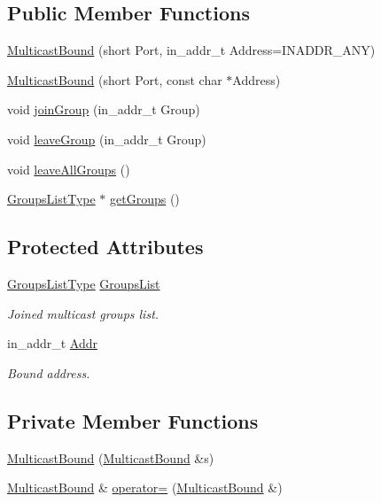 \subsection*{Public Member Functions}
\begin{DoxyCompactItemize}
\item 
\hyperlink{classMulticastBound_aed105f983bf0ec03ddea66770e2622e7}{Multicast\+Bound} (short Port, in\+\_\+addr\+\_\+t Address=I\+N\+A\+D\+D\+R\+\_\+\+A\+NY)
\item 
\hyperlink{classMulticastBound_ae761776cabab795de9070aa631cbe7a7}{Multicast\+Bound} (short Port, const char $\ast$Address)
\item 
void \hyperlink{classMulticastBound_acfbbffdce81eb2930757ad6472b9b683}{join\+Group} (in\+\_\+addr\+\_\+t Group)
\item 
void \hyperlink{classMulticastBound_a85305ecf42f299160a535429563e6b94}{leave\+Group} (in\+\_\+addr\+\_\+t Group)
\item 
void \hyperlink{classMulticastBound_a3e61ea82cb090a348a1445b2c2a99dae}{leave\+All\+Groups} ()
\item 
\hyperlink{MulticastBound_8h_a9584173a620a338ea7d88264229e36dd}{Groups\+List\+Type} $\ast$ \hyperlink{classMulticastBound_a6d13e9136309c456b242cdc652e47062}{get\+Groups} ()
\end{DoxyCompactItemize}
\subsection*{Protected Attributes}
\begin{DoxyCompactItemize}
\item 
\hyperlink{MulticastBound_8h_a9584173a620a338ea7d88264229e36dd}{Groups\+List\+Type} \hyperlink{classMulticastBound_a717064ed29a84f4cc2c514eb3b1e695f}{Groups\+List}
\begin{DoxyCompactList}\small\item\em Joined multicast groups list. \end{DoxyCompactList}\item 
in\+\_\+addr\+\_\+t \hyperlink{classMulticastBound_ac7596721222c7cac2c3dcc44309aebc2}{Addr}
\begin{DoxyCompactList}\small\item\em Bound address. \end{DoxyCompactList}\end{DoxyCompactItemize}
\subsection*{Private Member Functions}
\begin{DoxyCompactItemize}
\item 
\hyperlink{classMulticastBound_ad5d067caa09a43a6eb3a6cdee5065550}{Multicast\+Bound} (\hyperlink{classMulticastBound}{Multicast\+Bound} \&s)
\item 
\hyperlink{classMulticastBound}{Multicast\+Bound} \& \hyperlink{classMulticastBound_a8b956721a93be63018cc49fe04775207}{operator=} (\hyperlink{classMulticastBound}{Multicast\+Bound} \&)
\end{DoxyCompactItemize}
